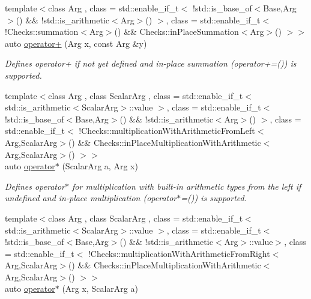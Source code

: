 \begin{DoxyCompactItemize}
\hypertarget{namespaceFunG_a063d3e8c19dbea3ee1396736fecb64e1}{{\footnotesize template$<$class Arg , class  = std\-::enable\-\_\-if\-\_\-t$<$ !std\-::is\-\_\-base\-\_\-of$<$\-Base,\-Arg$>$() \&\& !std\-::is\-\_\-arithmetic$<$\-Arg$>$() $>$, class  = std\-::enable\-\_\-if\-\_\-t$<$ !\-Checks\-::summation$<$\-Arg$>$() \&\&                                       Checks\-::in\-Place\-Summation$<$\-Arg$>$() $>$$>$ }\\auto \hyperlink{namespaceFunG_a063d3e8c19dbea3ee1396736fecb64e1}{operator+} (Arg x, const Arg \&y)}\label{namespaceFunG_a063d3e8c19dbea3ee1396736fecb64e1}

\begin{DoxyCompactList}\small\item\em Defines operator+ if not yet defined and in-\/place summation (operator+=()) is supported. \end{DoxyCompactList}\item 
\hypertarget{namespaceFunG_a9b303ce8718a6f64b035e7e782370734}{{\footnotesize template$<$class Arg , class Scalar\-Arg , class  = std\-::enable\-\_\-if\-\_\-t$<$ std\-::is\-\_\-arithmetic$<$\-Scalar\-Arg$>$\-::value $>$, class  = std\-::enable\-\_\-if\-\_\-t$<$ !std\-::is\-\_\-base\-\_\-of$<$\-Base,\-Arg$>$() \&\& !std\-::is\-\_\-arithmetic$<$\-Arg$>$() $>$, class  = std\-::enable\-\_\-if\-\_\-t$<$ !\-Checks\-::multiplication\-With\-Arithmetic\-From\-Left$<$\-Arg,\-Scalar\-Arg$>$() \&\&                                       Checks\-::in\-Place\-Multiplication\-With\-Arithmetic$<$\-Arg,\-Scalar\-Arg$>$() $>$$>$ }\\auto \hyperlink{namespaceFunG_a9b303ce8718a6f64b035e7e782370734}{operator$\ast$} (Scalar\-Arg a, Arg x)}\label{namespaceFunG_a9b303ce8718a6f64b035e7e782370734}

\begin{DoxyCompactList}\small\item\em Defines operator$\ast$ for multiplication with built-\/in arithmetic types from the left if undefined and in-\/place multiplication (operator$\ast$=()) is supported. \end{DoxyCompactList}\item 
\hypertarget{namespaceFunG_a3cd5a2cb1abba842154691bb84aab896}{{\footnotesize template$<$class Arg , class Scalar\-Arg , class  = std\-::enable\-\_\-if\-\_\-t$<$ std\-::is\-\_\-arithmetic$<$\-Scalar\-Arg$>$\-::value $>$, class  = std\-::enable\-\_\-if\-\_\-t$<$ !std\-::is\-\_\-base\-\_\-of$<$\-Base,\-Arg$>$() \&\& !std\-::is\-\_\-arithmetic$<$\-Arg$>$\-::value$>$, class  = std\-::enable\-\_\-if\-\_\-t$<$ !\-Checks\-::multiplication\-With\-Arithmetic\-From\-Right$<$\-Arg,\-Scalar\-Arg$>$() \&\&                                       Checks\-::in\-Place\-Multiplication\-With\-Arithmetic$<$\-Arg,\-Scalar\-Arg$>$() $>$$>$ }\\auto \hyperlink{namespaceFunG_a3cd5a2cb1abba842154691bb84aab896}{operator$\ast$} (Arg x, Scalar\-Arg a)}\label{namespaceFunG_a3cd5a2cb1abba842154691bb84aab896}


\end{DoxyCompactItemize}
